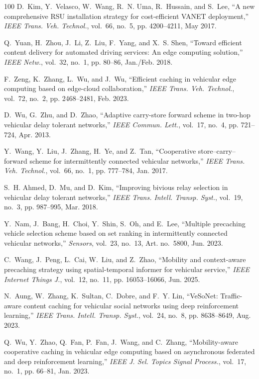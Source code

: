 \documentclass[journal]{IEEEtran}
\begin{document}
\begin{thebibliography}{100}
D.~Kim, Y.~Velasco, W.~Wang, R.~N. Uma, R.~Hussain, and S.~Lee, ``A new comprehensive RSU installation strategy for cost-efficient VANET deployment,'' \textit{IEEE Trans. Veh. Technol.}, vol.~66, no.~5, pp. 4200--4211, May 2017.

Q.~Yuan, H.~Zhou, J.~Li, Z.~Liu, F.~Yang, and X.~S. Shen, ``Toward efficient content delivery for automated driving services: An edge computing solution,'' \textit{IEEE Netw.}, vol.~32, no.~1, pp. 80--86, Jan./Feb. 2018.

F.~Zeng, K.~Zhang, L.~Wu, and J.~Wu, ``Efficient caching in vehicular edge computing based on edge-cloud collaboration,'' \textit{IEEE Trans. Veh. Technol.}, vol.~72, no.~2, pp. 2468--2481, Feb. 2023.

D.~Wu, G.~Zhu, and D.~Zhao, ``Adaptive carry-store forward scheme in two-hop vehicular delay tolerant networks,'' \textit{IEEE Commun. Lett.}, vol.~17, no.~4, pp. 721--724, Apr. 2013.

Y.~Wang, Y.~Liu, J.~Zhang, H.~Ye, and Z.~Tan, ``Cooperative store--carry--forward scheme for intermittently connected vehicular networks,'' \textit{IEEE Trans. Veh. Technol.}, vol.~66, no.~1, pp. 777--784, Jan. 2017.

S.~H. Ahmed, D.~Mu, and D.~Kim, ``Improving bivious relay selection in vehicular delay tolerant networks,'' \textit{IEEE Trans. Intell. Transp. Syst.}, vol.~19, no.~3, pp. 987--995, Mar. 2018.

Y.~Nam, J.~Bang, H.~Choi, Y.~Shin, S.~Oh, and E.~Lee, ``Multiple precaching vehicle selection scheme based on set ranking in intermittently connected vehicular networks,'' \textit{Sensors}, vol.~23, no.~13, Art. no.~5800, Jun. 2023.

C.~Wang, J.~Peng, L.~Cai, W.~Liu, and Z.~Zhao, ``Mobility and context-aware precaching strategy using spatial-temporal informer for vehicular service,'' \textit{IEEE Internet Things J.}, vol.~12, no.~11, pp. 16053--16066, Jun. 2025.

N.~Aung, W.~Zhang, K.~Sultan, C.~Dobre, and F.~Y. Lin, ``VeSoNet: Traffic-aware content caching for vehicular social networks using deep reinforcement learning,'' \textit{IEEE Trans. Intell. Transp. Syst.}, vol.~24, no.~8, pp. 8638--8649, Aug. 2023.

Q.~Wu, Y.~Zhao, Q.~Fan, P.~Fan, J.~Wang, and C.~Zhang, ``Mobility-aware cooperative caching in vehicular edge computing based on asynchronous federated and deep reinforcement learning,'' \textit{IEEE J. Sel. Topics Signal Process.}, vol.~17, no.~1, pp. 66--81, Jan. 2023.


\end{thebibliography}
\end{document}

